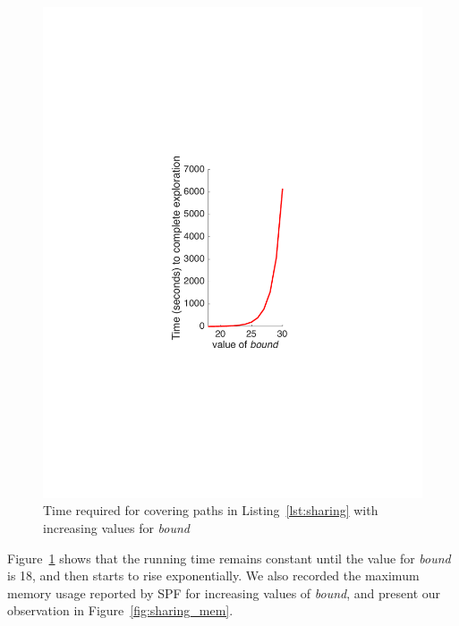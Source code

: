 \begin{figure}[]
\caption{Time required for covering paths in Listing~\ref{lst:sharing} with increasing values for \textit{bound}}
\label{fig:sharing_time}
\includegraphics[width=\columnwidth]{figures/sharing_time}
\end{figure}
%
Figure~\ref{fig:sharing_time} shows that the running time remains constant until the value for \textit{bound} is 18, and then starts to rise exponentially.
%
We also recorded the maximum memory usage reported by SPF for increasing values of \textit{bound}, and present our observation in Figure~\ref{fig:sharing_mem}.
